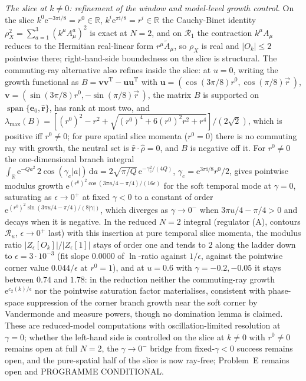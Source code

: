 \emph{The slice at \(k\ne0\): refinement of the window and model-level growth control.} On the slice \(k^0\mathrm e^{-3\pi\mathrm i/8}=r^0\in\mathbb R\), \(k^i\mathrm e^{\pi\mathrm i/8}=r^i\in\mathbb R\) the Cauchy-Binet identity \(\rho_X^2=\sum_{a=1}^{3}{(k^\mu A^a_\mu)}^2\) is exact at \(N=2\), and on \(\mathcal R_1\) the contraction \(k^\mu A_\mu\) reduces to the Hermitian real-linear form \(r^\mu\tilde A_\mu\), so \(\rho_X\) is real and \(|O_k|\le2\) pointwise there; right-hand-side boundedness on the slice is structural. The commuting-ray alternative also refines inside the slice: at \(u=0\), writing the growth functional as \(B=\mathbf v\mathbf v^{\mathrm T}-\mathbf u\mathbf u^{\mathrm T}\) with \(\mathbf u=(\cos(3\pi/8)r^0,\cos(\pi/8)\vec r\,)\), \(\mathbf v=(\sin(3\pi/8)r^0,-\sin(\pi/8)\vec r\,)\), the matrix \(B\) is supported on \(\operatorname{span}\{\mathbf e_0,\hat{\mathbf r}\}\), has rank at most two, and \(\lambda_{\max}(B)=[{(r^0)}^2-r^2+\sqrt{{(r^0)}^4+6{(r^0)}^2r^2+r^4}]/(2\sqrt2)\), which is positive iff \(r^0\ne0\); for pure spatial slice momenta (\(r^0=0\)) there is no commuting ray with growth, the neutral set is \(\hat{\mathbf r}\cdot\hat\rho=0\), and \(B\) is negative off it. For \(r^0\ne0\) the one-dimensional branch integral \(\int_{\mathbb R}\mathrm e^{-Qa^2}\,2\cos(\gamma_{\mathrm c}|a|)\,\mathrm da=2\sqrt{\pi/Q}\,\mathrm e^{-\gamma_{\mathrm c}^2/(4Q)}\), \(\gamma_{\mathrm c}=\mathrm e^{3\pi\mathrm i/8}r^0/2\), gives pointwise modulus growth \(\mathrm e^{{(r^0)}^2\cos(3\pi u/4-\pi/4)/(16\epsilon)}\) for the soft temporal mode at \(\gamma=0\), saturating as \(\epsilon\to0^+\) at fixed \(\gamma<0\) to a constant of order \(\mathrm e^{{(r^0)}^2\sin(3\pi u/4-\pi/4)/(8|\gamma|)}\), which diverges as \(\gamma\to0^-\) when \(3\pi u/4-\pi/4>0\) and decays when it is negative. In the reduced \(N=2\) integral (regulator (A), contours \(\mathcal R_u\), \(\epsilon\to0^+\) last) with this insertion at pure temporal slice momenta, the modulus ratio \(|Z_\epsilon[O_k]|/|Z_\epsilon[1]|\) stays of order one and tends to \(2\) along the ladder down to \(\epsilon=3\cdot10^{-3}\) (fit slope \(0.0000\) of \(\ln\)-ratio against \(1/\epsilon\), against the pointwise corner value \(0.044/\epsilon\) at \(r^0=1\)), and at \(u=0.6\) with \(\gamma=-0.2,-0.05\) it stays between \(0.74\) and \(1.78\): in the reduction neither the commuting-ray growth \(\mathrm e^{c_2(k)/\epsilon}\) nor the pointwise saturation factor materialises, consistent with phase-space suppression of the corner branch growth near the soft corner by Vandermonde and measure powers, though no domination lemma is claimed. These are reduced-model computations with oscillation-limited resolution at \(\gamma=0\); whether the left-hand side is controlled on the slice at \(k\ne0\) with \(r^0\ne0\) remains open at full \(N=2\), the \(\gamma\to0^-\) bridge from fixed-\(\gamma<0\) success remains open, and the pure-spatial half of the slice is now ray-free; Problem~E remains open and PROGRAMME CONDITIONAL.

